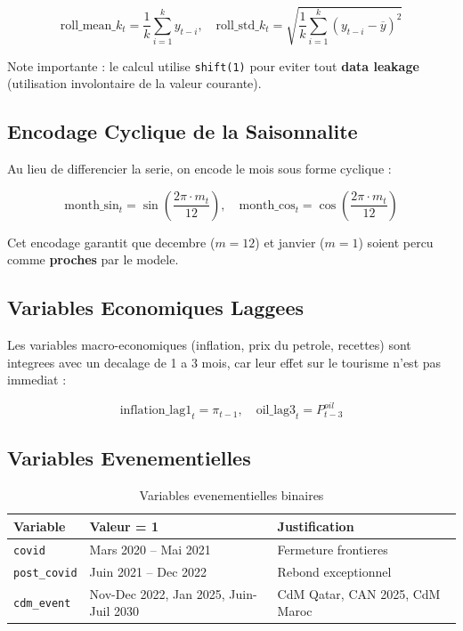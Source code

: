 \documentclass[12pt,a4paper]{report}
\begin{document}
\begin{itemize}[leftmargin=1.5em]
\[
\text{roll\_mean}\_k_t = \frac{1}{k}\sum_{i=1}^{k} y_{t-i}, \quad
\text{roll\_std}\_k_t = \sqrt{\frac{1}{k}\sum_{i=1}^{k}(y_{t-i} - \overline{y})^2}
\]

Note importante : le calcul utilise \texttt{shift(1)} pour eviter
tout \textbf{data leakage} (utilisation involontaire de la valeur courante).

\subsection{Encodage Cyclique de la Saisonnalite}

Au lieu de differencier la serie, on encode le mois sous forme cyclique :

\[
\text{month\_sin}_t = \sin\!\left(\frac{2\pi \cdot m_t}{12}\right), \quad
\text{month\_cos}_t = \cos\!\left(\frac{2\pi \cdot m_t}{12}\right)
\]

Cet encodage garantit que decembre ($m=12$) et janvier ($m=1$) soient
percu comme \textbf{proches} par le modele.

\subsection{Variables Economiques Laggees}

Les variables macro-economiques (inflation, prix du petrole, recettes)
sont integrees avec un decalage de 1 a 3 mois, car leur effet
sur le tourisme n'est pas immediat :

\[
\text{inflation\_lag1}_t = \pi_{t-1}, \quad
\text{oil\_lag3}_t = P^{oil}_{t-3}
\]

\subsection{Variables Evenementielles}

\begin{table}[H]
\centering\small\renewcommand{\arraystretch}{1.4}
\begin{tabular}{lp{4cm}p{5.5cm}}
\toprule
\textbf{Variable} & \textbf{Valeur = 1} & \textbf{Justification} \\
\midrule
\texttt{covid}      & Mars 2020 -- Mai 2021 & Fermeture frontieres \\
\texttt{post\_covid}& Juin 2021 -- Dec 2022 & Rebond exceptionnel \\
\texttt{cdm\_event} & Nov-Dec 2022, Jan 2025, Juin-Juil 2030
  & CdM Qatar, CAN 2025, CdM Maroc \\
\bottomrule
\end{tabular}
\caption{Variables evenementielles binaires}
\end{table}


\end{itemize}
\end{document}
